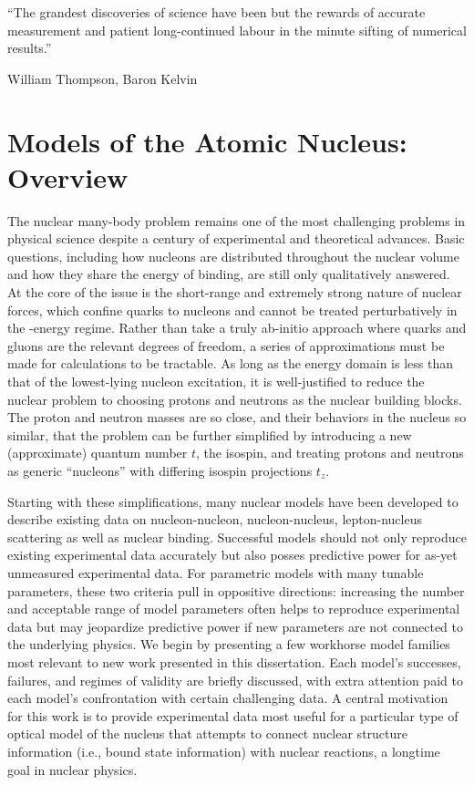 \epigraph{``The grandest discoveries of science have been but the rewards of
    accurate measurement and patient long-continued labour in the minute
sifting of numerical results.''}{William Thompson,  Baron Kelvin}
\section{Models of the Atomic Nucleus: Overview}
The nuclear many-body problem remains one of the most challenging problems in
physical science despite a century of experimental and theoretical advances.
Basic questions, including how nucleons are distributed throughout the nuclear
volume and how they share the energy of binding, are still only qualitatively
answered. At the core of the issue is the short-range and extremely strong
nature of nuclear forces, which confine
quarks to nucleons and cannot be treated perturbatively in the \mega\electronvolt-energy regime.
Rather than take a truly ab-initio approach where quarks and gluons
are the relevant degrees of freedom, a series of approximations must be made
for calculations to be tractable. As long as the energy domain is less than that
of the lowest-lying nucleon excitation, it is well-justified to reduce the
nuclear problem to choosing protons and neutrons as the nuclear building blocks.
The proton and neutron masses are so close, and their behaviors in the nucleus so similar,
that the problem can be further simplified by introducing a new (approximate) quantum number
$t$, the isospin, and treating protons and neutrons as generic ``nucleons'' with differing isospin
projections $t_{z}$.

Starting with these simplifications, many nuclear models have been developed to describe existing 
data on nucleon-nucleon, nucleon-nucleus, lepton-nucleus scattering as well as
nuclear binding. Successful models should not only reproduce existing
experimental data accurately but also posses predictive power for as-yet unmeasured
experimental data. For parametric models
with many tunable parameters, these two criteria pull in oppositive directions:
increasing the number
and acceptable range of model parameters often helps to reproduce experimental data but may
jeopardize predictive power if new parameters are not connected to the underlying physics.
We begin by presenting a few workhorse model families most relevant
to new work presented in this dissertation. Each model's successes,
failures, and regimes of validity are briefly discussed, with extra attention paid
to each model's confrontation with certain challenging data.
A central motivation for this work is to provide experimental data most useful
for a particular type of optical model of the nucleus that attempts to
connect nuclear structure information (i.e., bound state information) with nuclear
reactions, a longtime goal in nuclear physics. 
